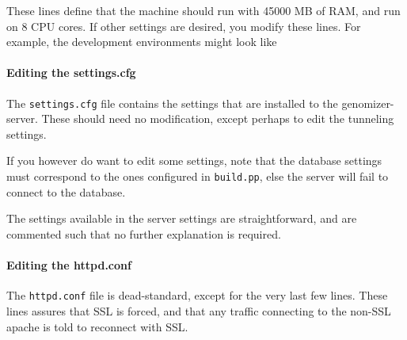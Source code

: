 \begin{Shaded}
\begin{Highlighting}[numbers=left,,]
  
\end{Highlighting}
\end{Shaded}

These lines define that the machine should run with 45000 MB of RAM, and
run on 8 CPU cores. If other settings are desired, you modify these
lines. For example, the development environments might look like

\begin{Shaded}
\begin{Highlighting}[numbers=left,,]
  
\end{Highlighting}
\end{Shaded}

\paragraph{Editing the settings.cfg}\label{editing-the-settings.cfg}

The \texttt{settings.cfg} file contains the settings that are installed
to the genomizer-server. These should need no modification, except
perhaps to edit the tunneling settings.

If you however do want to edit some settings, note that the database
settings must correspond to the ones configured in \texttt{build.pp},
else the server will fail to connect to the database.

The settings available in the server settings are straightforward, and
are commented such that no further explanation is required.

\paragraph{Editing the httpd.conf}\label{editing-the-httpd.conf}

The \texttt{httpd.conf} file is dead-standard, except for the very last
few lines. These lines assures that SSL is forced, and that any traffic
connecting to the non-SSL apache is told to reconnect with SSL.

